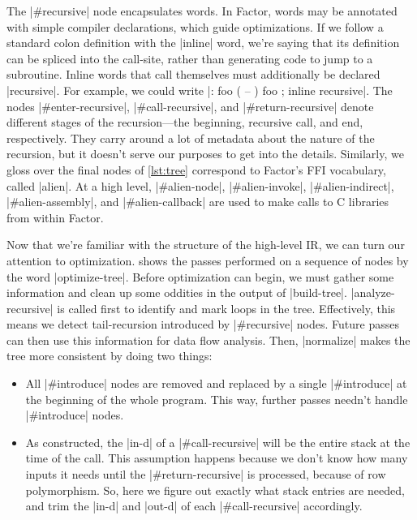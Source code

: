 The \factor|#recursive| node encapsulates  words.  In
Factor, words may be annotated with simple compiler declarations, which guide
optimizations.  If we follow a standard colon definition with the
\factor|inline| word, we're saying that its definition can be spliced into the
call-site, rather than generating code to jump to a subroutine.  Inline words
that call themselves must additionally be declared \factor|recursive|.  For
example, we could write
%
\factor|: foo ( -- ) foo ; inline recursive|.
%
The nodes \factor|#enter-recursive|, \factor|#call-recursive|, and
\factor|#return-recursive| denote different stages of the recursion---the
beginning, recursive call, and end, respectively.  They carry around a lot of
metadata about the nature of the recursion, but it doesn't serve our purposes
to get into the details.  Similarly, we gloss over the final nodes of
\vref{lst:tree} correspond to Factor's \gls{FFI} vocabulary, called
\factor|alien|.  At a high level, \factor|#alien-node|, \factor|#alien-invoke|,
\factor|#alien-indirect|, \factor|#alien-assembly|, and
\factor|#alien-callback| are used to make calls to C libraries from within
Factor.


Now that we're familiar with the structure of the high-level \gls{IR}, we can
turn our attention to optimization.   shows the passes
performed on a sequence of nodes by the word \factor|optimize-tree|.  Before
optimization can begin, we must gather some information and clean up some
oddities in the output of \factor|build-tree|.  \factor|analyze-recursive| is
called first to identify and mark loops in the tree.  Effectively, this means
we detect tail-recursion introduced by \factor|#recursive| nodes.  Future
passes can then use this information for data flow analysis.  Then,
\factor|normalize| makes the tree more consistent by doing two things:
%
\begin{itemize}
%
  \item All \factor|#introduce| nodes are removed and replaced by a single
        \factor|#introduce| at the beginning of the whole program.  This way,
        further passes needn't handle \factor|#introduce| nodes.
%
  \item As constructed, the \factor|in-d| of a \factor|#call-recursive| will be
        the entire stack at the time of the call.  This assumption happens
        because we don't know how many inputs it needs until the
        \factor|#return-recursive| is processed, because of row polymorphism.
        So, here we figure out exactly what stack entries are needed, and trim
        the \factor|in-d| and \factor|out-d| of each \factor|#call-recursive|
        accordingly.
%
\end{itemize}

